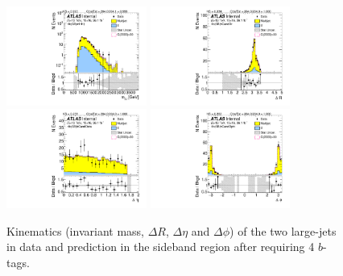 \begin{figure}[htb!]
\begin{center}
\includegraphics[width=0.41\textwidth,angle=-90]{figures/boosted/Sideband/b77_FourTag_Sideband_mHH_l_1.pdf}
\includegraphics[width=0.41\textwidth,angle=-90]{figures/boosted/Sideband/b77_FourTag_Sideband_hCandDr.pdf}\\
\includegraphics[width=0.41\textwidth,angle=-90]{figures/boosted/Sideband/b77_FourTag_Sideband_hCandDeta.pdf}
\includegraphics[width=0.41\textwidth,angle=-90]{figures/boosted/Sideband/b77_FourTag_Sideband_hCandDphi.pdf}
  \caption{Kinematics (invariant mass, $\Delta R$, $\Delta \eta$ and $\Delta \phi$) of the two large-\R jets in data and prediction in the sideband region after requiring 4 $b$-tags. }
  \label{fig:boosted-4b-sideband-ak10-system}
\end{center}
\end{figure}

